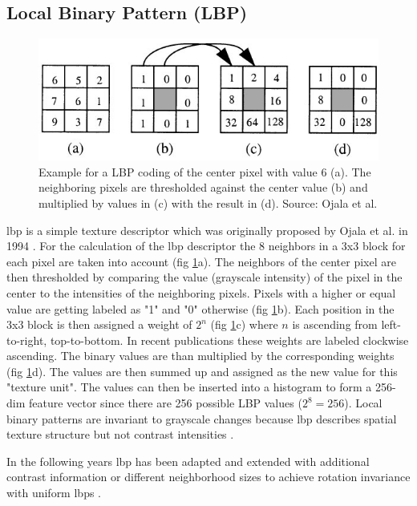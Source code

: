 \subsection[LBP]{Local Binary Pattern (LBP)}
\begin{figure}[ht]
	\centering
	\includegraphics[width=\linewidth]{figures/theoryLBP_coding}
	\caption{Example for a LBP coding of the center pixel with value 6 (a). The neighboring pixels are thresholded against the center value (b) and multiplied by values in (c) with the result in (d). Source: Ojala et al. \cite{Ojala1999}}
	\label{fig:lbpCoding}
\end{figure}
\acrfull{lbp} is a simple texture descriptor which was originally proposed by Ojala et al. in 1994 \cite{Ojala1994}. For the calculation of the \gls{lbp} descriptor the 8 neighbors in a 3x3 block for each pixel are taken into account {(fig \ref{fig:lbpCoding}a)}. The neighbors of the center pixel are then thresholded by comparing the value {(grayscale intensity)} of the pixel in the center to the intensities of the neighboring pixels. Pixels with a higher or equal value are getting labeled as "1" and "0" otherwise {(fig \ref{fig:lbpCoding}b)}. Each position in the 3x3 block is then assigned a weight of $2^n$ {(fig \ref{fig:lbpCoding}c)} where $n$ is ascending from left-to-right, top-to-bottom. In recent publications these weights are labeled clockwise ascending. The binary values are than multiplied by the corresponding weights {(fig \ref{fig:lbpCoding}d)}. The values are then summed up and assigned as the new value for this "texture unit". The values can then be inserted into a histogram to form a 256-dim feature vector since there are 256 possible LBP values {($2^8=256$)}. Local binary patterns are invariant to grayscale changes because \gls{lbp} describes spatial texture structure but not contrast intensities \cite{Ojala1999}.  

In the following years \gls{lbp} has been adapted and extended with additional contrast information \cite{Ojala1999} or different neighborhood sizes to achieve rotation invariance with uniform \glspl{lbp} \cite{Ojala2002}.


